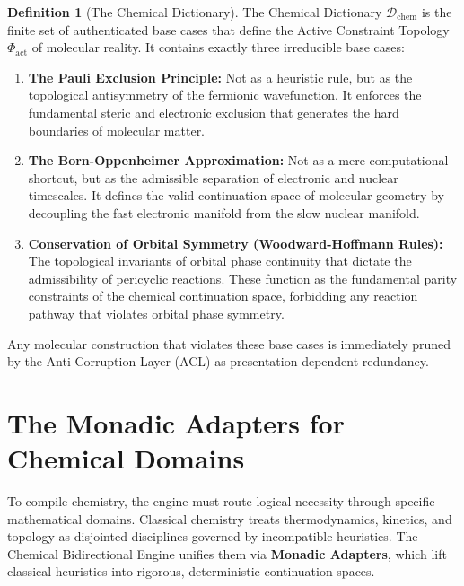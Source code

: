 \documentclass[11pt,openany]{extbook}
\theoremstyle{plain}
\theoremstyle{definition}
\newtheorem{definition}{Definition}[chapter]
\begin{document}
\begin{definition}[The Chemical Dictionary]
The Chemical Dictionary $\mathcal{D}_{\text{chem}}$ is the finite set of authenticated base cases that define the Active Constraint Topology $\Phi_{\text{act}}$ of molecular reality. It contains exactly three irreducible base cases:
\begin{enumerate}
    \item \textbf{The Pauli Exclusion Principle:} Not as a heuristic rule, but as the topological antisymmetry of the fermionic wavefunction. It enforces the fundamental steric and electronic exclusion that generates the hard boundaries of molecular matter.
    \item \textbf{The Born-Oppenheimer Approximation:} Not as a mere computational shortcut, but as the admissible separation of electronic and nuclear timescales. It defines the valid continuation space of molecular geometry by decoupling the fast electronic manifold from the slow nuclear manifold.
    \item \textbf{Conservation of Orbital Symmetry (Woodward-Hoffmann Rules):} The topological invariants of orbital phase continuity that dictate the admissibility of pericyclic reactions. These function as the fundamental parity constraints of the chemical continuation space, forbidding any reaction pathway that violates orbital phase symmetry.
\end{enumerate}
\end{definition}

Any molecular construction that violates these base cases is immediately pruned by the Anti-Corruption Layer (ACL) as presentation-dependent redundancy.

\section{The Monadic Adapters for Chemical Domains}

To compile chemistry, the engine must route logical necessity through specific mathematical domains. Classical chemistry treats thermodynamics, kinetics, and topology as disjointed disciplines governed by incompatible heuristics. The Chemical Bidirectional Engine unifies them via \textbf{Monadic Adapters}, which lift classical heuristics into rigorous, deterministic continuation spaces.
\end{document}
